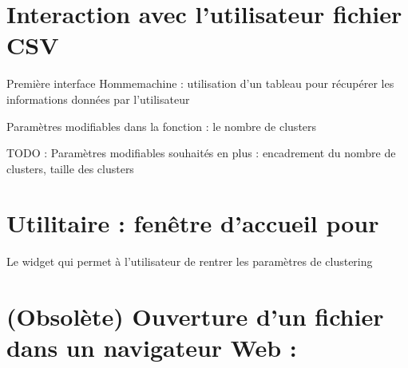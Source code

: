 \documentclass[letterpaper,10pt,french]{sphinxmanual}
\begin{document}
\section{Interaction avec l’utilisateur  fichier CSV}
\label{\detokenize{index:module-src.ihm.ihm_csv}}\label{\detokenize{index:interaction-avec-l-utilisateur-via-fichier-csv}}
\sphinxAtStartPar
Première interface Homme\sphinxhyphen{}machine : utilisation d’un tableau  pour récupérer les informations données par l’utilisateur

\sphinxAtStartPar
Paramètres modifiables dans la fonction  : le nombre de clusters

\sphinxAtStartPar
TODO : Paramètres modifiables souhaités en plus : encadrement du nombre de clusters, taille des clusters


\section{Utilitaire : fenêtre d’accueil pour }
\label{\detokenize{index:module-src.ihm.ihm_pyqt}}\label{\detokenize{index:utilitaire-fenetre-d-accueil-pour-ihm-complet}}

\begin{fulllineitems}
\label{\detokenize{index:src.ihm.ihm_pyqt.InputFenetre}}
\sphinxAtStartPar
Le widget qui permet à l’utilisateur de rentrer les paramètres de clustering

\end{fulllineitems}



\section{(Obsolète) Ouverture d’un fichier  dans un navigateur Web :}
\label{\detokenize{index:module-src.ihm.web}}\label{\detokenize{index:obsolete-ouverture-d-un-fichier-html-dans-un-navigateur-web}}
\end{document}
